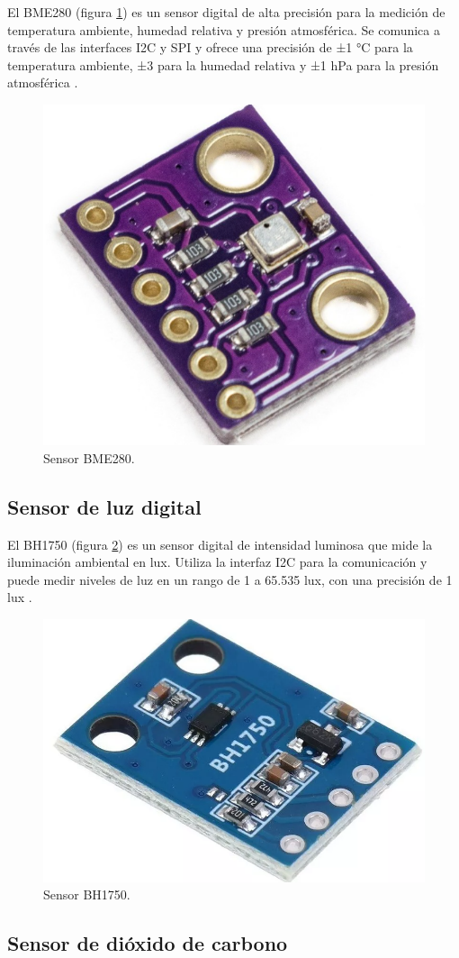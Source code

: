 El BME280 (figura \ref{fig:BME280}) es un sensor digital de alta precisión para
la medición de temperatura ambiente, humedad relativa y presión atmosférica. Se
comunica a través de las interfaces I2C y SPI y ofrece una precisión de ±1 °C
para la temperatura ambiente, ±3 \code{\%} para la humedad relativa y ±1 hPa
para la presión atmosférica \cite{BoschBME280}.

\begin{figure}[H]
	\centering
	\includegraphics[height=.15\textwidth]{./Images/4.png}
	\caption{Sensor BME280\protect\footnotemark.}
	\label{fig:BME280}
\end{figure}


\subsection{Sensor de luz digital}\label{sec:BH1750}

El BH1750 (figura \ref{fig:BH1750}) es un sensor digital de intensidad luminosa
que mide la iluminación ambiental en lux. Utiliza la interfaz I2C para la
comunicación y puede medir niveles de luz en un rango de 1 a 65.535 lux, con
una precisión de 1 lux \cite{ROHM_BH1750}.

\begin{figure}[H]
	\centering
	\includegraphics[height=.15\textwidth]{./Images/5.png}
	\caption{Sensor BH1750\protect\footnotemark.}
	\label{fig:BH1750}
\end{figure}


\subsection{Sensor de dióxido de carbono}

